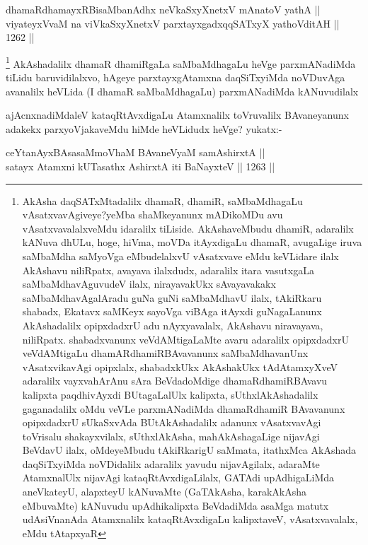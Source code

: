 \begin{shl}
dhamaRdhamayxRBisaMbanAdhx neVkaSxyXnetxV mAnatoV yathA ||  \\
viyateyxVvaM na viVkaSxyXnetxV parxtayxgadxqqSATxyX yathoVditAH ||  1262 ||  
\end{shl}

\begin{artha}
\footnote{AkAsha daqSATxMtadalilx dhamaR, dhamiR, saMbaMdhagaLu vAsatxvavAgiveye?yeMba shaMkeyanunx mADikoMDu avu vAsatxvavalalxveMdu idaralilx tiLiside. AkAshaveMbudu dhamiR, adaralilx kANuva dhULu, hoge, hiVma, moVDa itAyxdigaLu dhamaR, avugaLige iruva saMbaMdha saMyoVga eMbudelalxvU vAsatxvave eMdu keVLidare ilalx AkAshavu niliRpatx, avayava ilalxdudx, adaralilx itara vasutxgaLa saMbaMdhavAguvudeV ilalx, nirayavakUkx sAvayavakakx saMbaMdhavAgalAradu guNa guNi saMbaMdhavU ilalx, tAkiRkaru shabadx, Ekatavx saMKeyx sayoVga viBAga itAyxdi guNagaLanunx AkAshadalilx opipxdadxrU adu nAyxyavalalx, AkAshavu niravayava, niliRpatx. shabadxvanunx veVdAMtigaLaMte avaru adaralilx opipxdadxrU veVdAMtigaLu dhamARdhamiRBAvavanunx saMbaMdhavanUnx vAsatxvikavAgi opipxlalx, shabadxkUkx AkAshakUkx tAdAtamxyXveV adaralilx vayxvahArAnu sAra BeVdadoMdige dhamaRdhamiRBAvavu kalipxta paqdhivAyxdi BUtagaLalUlx kalipxta, sUthxlAkAshadalilx gaganadalilx oMdu veVLe parxmANadiMda dhamaRdhamiR BAvavanunx opipxdadxrU sUkaSxvAda BUtAkAshadalilx adanunx vAsatxvavAgi toVrisalu shakayxvilalx, sUthxlAkAsha, mahAkAshagaLige nijavAgi BeVdavU ilalx, oMdeyeMbudu tAkiRkarigU saMmata, itathxMca AkAshada daqSiTxyiMda noVDidalilx adaralilx yavudu nijavAgilalx, adaraMte AtamxnalUlx nijavAgi kataqRtAvxdigaLilalx, GATAdi upAdhigaLiMda aneVkateyU, alapxteyU kANuvaMte (GaTAkAsha, karakAkAsha eMbuvaMte) kANuvudu upAdhikalipxta BeVdadiMda asaMga matutx udAsiVnanAda Atamxnalilx kataqRtAvxdigaLu kalipxtaveV, vAsatxvavalalx, eMdu tAtapxyaR }
AkAshadalilx dhamaR dhamiRgaLa saMbaMdhagaLu heVge parxmANadiMda tiLidu baruvidilalxvo, hAgeye parxtayxgAtamxna daqSiTxyiMda noVDuvAga avanalilx heVLida (I dhamaR saMbaMdhagaLu) parxmANadiMda kANuvudilalx
\end{artha}

\begin{artha}
ajAcnxnadiMdaleV kataqRtAvxdigaLu Atamxnalilx toVruvalilx BAvaneyanunx adakekx parxyoVjakaveMdu hiMde heVLidudx heVge? yukatx:-
\end{artha}

\begin{shl}
ceYtanAyxBAsasaMmoVhaM BAvaneVyaM samAshirxtA || \\
satayx Atamxni kUTasathx AshirxtA iti BaNayxteV ||  1263 ||  
\end{shl}


